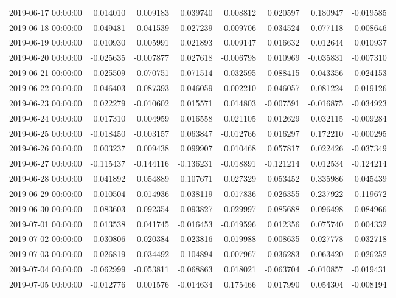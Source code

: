 \begin{tabular}{lrrrrrrr}
2019-06-17 00:00:00 & 0.014010 & 0.009183 & 0.039740 & 0.008812 & 0.020597 & 0.180947 & -0.019585 \\
2019-06-18 00:00:00 & -0.049481 & -0.041539 & -0.027239 & -0.009706 & -0.034524 & -0.077118 & 0.008646 \\
2019-06-19 00:00:00 & 0.010930 & 0.005991 & 0.021893 & 0.009147 & 0.016632 & 0.012644 & 0.010937 \\
2019-06-20 00:00:00 & -0.025635 & -0.007877 & 0.027618 & -0.006798 & 0.010969 & -0.035831 & -0.007310 \\
2019-06-21 00:00:00 & 0.025509 & 0.070751 & 0.071514 & 0.032595 & 0.088415 & -0.043356 & 0.024153 \\
2019-06-22 00:00:00 & 0.046403 & 0.087393 & 0.046059 & 0.002210 & 0.046057 & 0.081224 & 0.019126 \\
2019-06-23 00:00:00 & 0.022279 & -0.010602 & 0.015571 & 0.014803 & -0.007591 & -0.016875 & -0.034923 \\
2019-06-24 00:00:00 & 0.017310 & 0.004959 & 0.016558 & 0.021105 & 0.012629 & 0.032115 & -0.009284 \\
2019-06-25 00:00:00 & -0.018450 & -0.003157 & 0.063847 & -0.012766 & 0.016297 & 0.172210 & -0.000295 \\
2019-06-26 00:00:00 & 0.003237 & 0.009438 & 0.099907 & 0.010468 & 0.057817 & 0.022426 & -0.037349 \\
2019-06-27 00:00:00 & -0.115437 & -0.144116 & -0.136231 & -0.018891 & -0.121214 & 0.012534 & -0.124214 \\
2019-06-28 00:00:00 & 0.041892 & 0.054889 & 0.107671 & 0.027329 & 0.053452 & 0.335986 & 0.045439 \\
2019-06-29 00:00:00 & 0.010504 & 0.014936 & -0.038119 & 0.017836 & 0.026355 & 0.237922 & 0.119672 \\
2019-06-30 00:00:00 & -0.083603 & -0.092354 & -0.093827 & -0.029997 & -0.085688 & -0.096498 & -0.084966 \\
2019-07-01 00:00:00 & 0.013538 & 0.041745 & -0.016453 & -0.019596 & 0.012356 & 0.075740 & 0.004332 \\
2019-07-02 00:00:00 & -0.030806 & -0.020384 & 0.023816 & -0.019988 & -0.008635 & 0.027778 & -0.032718 \\
2019-07-03 00:00:00 & 0.026819 & 0.034492 & 0.104894 & 0.007967 & 0.036283 & -0.063420 & 0.026252 \\
2019-07-04 00:00:00 & -0.062999 & -0.053811 & -0.068863 & 0.018021 & -0.063704 & -0.010857 & -0.019431 \\
2019-07-05 00:00:00 & -0.012776 & 0.001576 & -0.014634 & 0.175466 & 0.017990 & 0.054304 & -0.008194 \\

\end{tabular}
